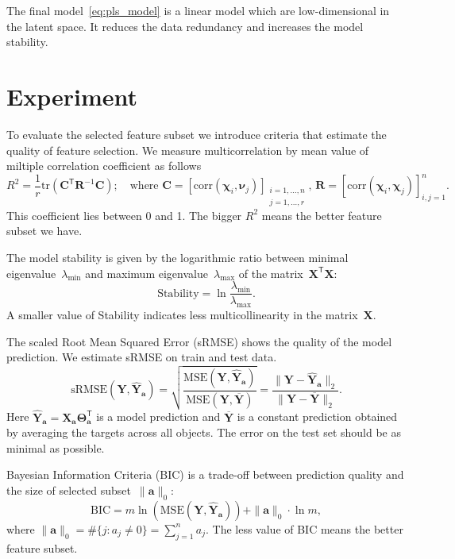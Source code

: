 \documentclass[12pt,twoside]{article}
\theoremstyle{definition}
\newcommand{\ba}{\mathbf{a}}
\newcommand{\bY}{\mathbf{Y}}
\newcommand{\bX}{\mathbf{X}}
\newcommand{\bC}{\mathbf{C}}
\newcommand{\T}{\mathsf{T}}
\newcommand{\bchi}{\boldsymbol{\chi}}
\newcommand{\bnu}{\boldsymbol{\nu}}
\newcommand{\bTheta}{\boldsymbol{\Theta}}
\begin{document}
The final model~\eqref{eq:pls_model} is a linear model which are low-dimensional in the latent space. 
It reduces the data redundancy and increases the model stability. 

\section{Experiment}

To evaluate the selected feature subset we introduce criteria that estimate the quality of feature selection.
We measure multicorrelation by mean value of miltiple correlation coefficient as follows
\begin{equation*}
R^2 = \frac{1}{r} \text{tr} \left( \bC^{\T} \mathbf{R}^{-1} \bC \right); \quad \text{where }\bC = [ \text{corr}(\bchi_i, \bnu_j)]_{\substack{i=1, \dots, n \\ j=1, \dots, r}}, \, \mathbf{R} = [ \text{corr}(\bchi_i, \bchi_j)]_{i, j = 1}^n.
\end{equation*}
This coefficient lies between 0 and 1. The bigger $R^2$ means the better feature subset we have.

The model stability is given by the logarithmic ratio between minimal eigenvalue~$\lambda_{\min}$ and maximum eigenvalue~$\lambda_{\max}$ of the matrix~$\bX^{\T} \bX$:
\begin{equation*}
\text{Stability} = \ln \frac{\lambda_{\min}}{\lambda_{\max}}.
\end{equation*}
A smaller value of Stability indicates less multicollinearity in the matrix~$\bX$.

The scaled Root Mean Squared Error (sRMSE) shows the quality of the model prediction. We estimate sRMSE on train and test data.
\begin{equation*}
\text{sRMSE}(\bY, \widehat{\bY}_{\ba}) = \sqrt{\frac{\text{MSE} (\bY, \widehat{\bY}_{\ba})}{\text{MSE} (\bY, \overline{\bY})}} =  \frac{\| \bY - \widehat{\bY}_{\ba} \|_2}{\| \bY - \overline{\bY} \|_2}.
\end{equation*}
Here $\widehat{\bY}_{\ba} = \bX_{\ba} \bTheta_{\ba}^{\T}$ is a model prediction and $\overline{\bY}$ is a constant prediction obtained by averaging the targets across all objects.
The error on the test set should be as minimal as possible.

Bayesian Information Criteria (BIC) is a trade-off between prediction quality and the size of selected subset~$\|\ba\|_0$:
\begin{equation*}
\text{BIC} = m \ln \left( \text{MSE} ( \bY, \widehat{\bY}_{\ba})\right) + \| \ba \|_0 \cdot \ln m,
\end{equation*}
where $\|\ba\|_0 = \#\{j: a_j \neq 0\}= \sum_{j=1}^n a_j$.
The less value of BIC means the better feature subset.
\end{document}
